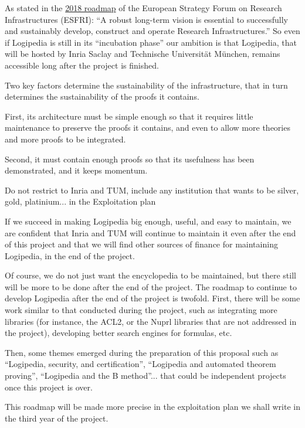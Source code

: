 As stated in the \href{http://roadmap2018.esfri.eu/media/1048/rm2018-part1-20.pdf}{2018 roadmap} of the
European Strategy Forum on Research Infrastructures (ESFRI): ``A robust
long-term vision is essential to successfully and sustainably develop,
construct and operate Research Infrastructures.'' So even if
Logipedia is still in its ``incubation phase'' our ambition is that
Logipedia, that will be hosted by Inria Saclay and Technische
Universität München, remains accessible long after the project is
finished.

Two key factors determine the sustainability of the infrastructure,
that in turn determines the sustainability of the proofs it contains.
\begin{compactitem}
\item First, its architecture must be simple enough so that it requires
  little maintenance to preserve the proofs it contains, and even to
  allow more theories and more proofs to be integrated.
\item Second, it must contain enough proofs so that its usefulness has been
  demonstrated, and it keeps momentum. 

  {\color{red} Do not restrict to Inria and TUM, include any institution that wants to be
  silver, gold, platinium... in the Exploitation plan}
\end{compactitem}

If we succeed in making Logipedia big enough, useful, and easy to
maintain, we are confident that Inria and TUM will continue to
maintain it even after the end of this project and that we will find
other sources of finance for maintaining Logipedia, in the end of the
project.

Of course, we do not just want the encyclopedia to be maintained, but
there still will be more to be done after the end of the project. The
roadmap to continue to develop Logipedia after the end of the project
is twofold. First, there will be some work similar to that conducted
during the project, such as integrating more libraries (for instance,
the ACL2, or the Nuprl libraries that are not addressed in the
project), developing better search engines for formulas, etc.

Then, some themes emerged during the preparation of this proposal such
as ``Logipedia, security, and certification'', ``Logipedia and
automated theorem proving'', ``Logipedia and the B method''... that
could be independent projects once this project is over.

This roadmap will be made more precise in the exploitation plan
we shall write in the third year of the project.

